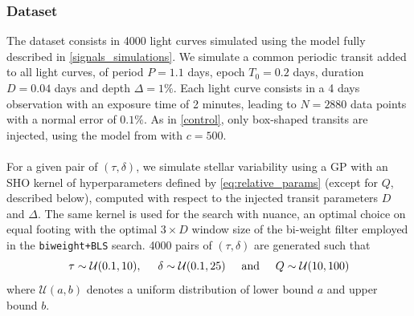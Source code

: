 \documentclass[modern]{aastex631}
\newcommand{\wtls}{\texttt{biweight+BLS}}
\begin{document}
\subsubsection*{Dataset}\label{sim_dataset}
The dataset consists in 4000 light curves simulated using the model fully described in \autoref{signals_simulations}. We simulate a common periodic transit added to all light curves, of period $P=1.1$ days, epoch $T_0=0.2$ days, duration $D=0.04$ days and depth $\Delta=1\%$. Each light curve consists in a 4 days observation with an exposure time of 2 minutes, leading to $N=2880$ data points with a normal error of $0.1\%$. As in \autoref{control}, only box-shaped transits are injected, using the model from \cite{protopapas} with $c=500$.
\\\\
For a given pair of $(\tau, \delta)$, we simulate stellar variability using a GP with an SHO kernel of hyperparameters defined by \autoref{eq:relative_params} (except for $Q$, described below), computed with respect to the injected transit parameters $D$ and $\Delta$. The same kernel is used for the search with \textsf{nuance}, an optimal choice on equal footing with the optimal $3\times D$ window size of the bi-weight filter employed in the \wtls{} search.
 4000 pairs of $(\tau, \delta)$ are generated such that
\begin{equation*}
    \tau \sim \mathcal{U}(0.1, 10), \hspace{0.5cm} \delta \sim \mathcal{U}(0.1, 25) \hspace{0.5cm}\text{and}\hspace{0.5cm} Q \sim \mathcal{U}(10, 100)
\end{equation*}
where $\mathcal{U}(a, b)$ denotes a uniform distribution of lower bound $a$ and upper bound $b$.
\end{document}
